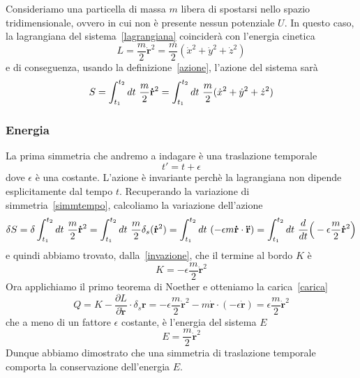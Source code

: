     \begin{example}
        Consideriamo una particella di massa $m$ libera di spostarsi nello spazio tridimensionale, ovvero in cui non è presente nessun potenziale $U$. In questo caso, la lagrangiana del sistema~\eqref{lagrangiana} coinciderà con l'energia cinetica 
    \begin{equation*}
        L = \frac{m}{2} \mathbf{\dot r}^2 = \frac{m}{2} (\dot x^2 + \dot y^2 + \dot z^2)
    \end{equation*}
        e di conseguenza, usando la definizione~\eqref{azione}, l'azione del sistema sarà
    \begin{equation*}
        S = \int_{t_1}^{t_2}dt~ \frac{m}{2} \mathbf{\dot r}^2 = \int_{t_1}^{t_2}dt~ \frac{m}{2} (\dot x^2 + \dot y^2 + \dot z^2)
    \end{equation*}

    \subsubsection{Energia}
        La prima simmetria che andremo a indagare è una traslazione temporale
    \begin{equation*}
        t' = t + \epsilon
    \end{equation*}
        dove $\epsilon$ è una costante. L'azione è invariante perchè la lagrangiana non dipende esplicitamente dal tempo $t$. Recuperando la variazione di simmetria~\eqref{simmtempo}, calcoliamo la variazione dell'azione
    \begin{equation*}
        \delta S = \delta \int_{t_1}^{t_2}dt~ \frac{m}{2} \mathbf{\dot r}^2 = \int_{t_1}^{t_2}dt~ \frac{m}{2} \delta_s ( \mathbf{\dot r}^2) = \int_{t_1}^{t_2}dt~ ( - \epsilon m  \mathbf{\dot r} \cdot \mathbf{\ddot r}) = \int_{t_1}^{t_2}dt~ \frac{d}{dt} \Big( -\epsilon \frac{m}{2}  \mathbf{\dot r}^2 \Big)
    \end{equation*}
        e quindi abbiamo trovato, dalla~\eqref{invazione}, che il termine al bordo $K$ è 
    \begin{equation*}
        K = - \epsilon \frac{m}{2} \mathbf{\dot r}^2
    \end{equation*}
        Ora applichiamo il primo teorema di Noether e otteniamo la carica~\eqref{carica} 
    \begin{equation*}
        Q = K - \frac{\partial L}{\partial  \mathbf{\dot r}} \cdot \delta_s  \mathbf r = - \epsilon \frac{m}{2} \mathbf{\dot r}^2 - m \mathbf{\dot r} \cdot (-\epsilon \mathbf{\dot r}) = \epsilon \frac{m}{2} \mathbf{\dot r}^2
    \end{equation*}
        che a meno di un fattore $\epsilon$ costante, è l'energia del sistema $E$
    \begin{equation*}
        E = \frac{m}{2} \mathbf{\dot r}^2
    \end{equation*}
        Dunque abbiamo dimostrato che una simmetria di traslazione temporale comporta la conservazione dell'energia $E$.


\end{example}
